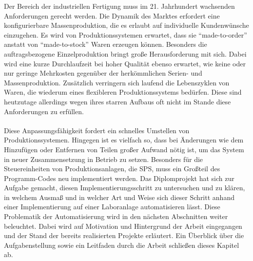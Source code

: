 
Der Bereich der industriellen Fertigung muss im 21. Jahrhundert wachsenden Anforderungen gerecht werden. Die Dynamik des Marktes erfordert eine konfigurierbare Massenproduktion, die es erlaubt auf individuelle Kundenwünsche einzugehen. Es wird von Produktionssystemen erwartet, dass sie "`made-to-order"' anstatt von "`made-to-stock"' Waren erzeugen können. Besonders die auftragsbezogene Einzelproduktion bringt große Herausforderung mit sich. Dabei wird eine kurze Durchlaufzeit bei hoher Qualität ebenso erwartet, wie keine oder nur geringe Mehrkosten gegenüber der herkömmlichen Serien- und Massenproduktion. Zusätzlich verringern sich laufend die Lebenszyklen von Waren, die wiederum eines flexibleren Produktionssystems bedürfen. Diese sind heutzutage allerdings wegen ihres starren Aufbaus oft nicht im Stande diese Anforderungen zu erfüllen. \cite{wlepuschitz_2014} \\\\
Diese Anpassungsfähigkeit fordert ein schnelles Umstellen von Produktionssystemen. Hingegen ist es vielfach so, dass bei Änderungen wie dem Hinzufügen oder Entfernen von Teilen großer Aufwand nötig ist, um das System in neuer Zusammensetzung in Betrieb zu setzen. Besonders für die Steuereinheiten von Produktionsanlagen, die \ac{SPS}, muss ein Großteil des Programm-Codes neu implementiert werden. \cite{Lepuschitz_PhaseAgent}  
Das Diplomprojekt hat sich zur Aufgabe gemacht, diesen Implementierungsschritt zu untersuchen und zu klären, in welchem Ausmaß und in welcher Art und Weise sich dieser Schritt anhand einer Implementierung auf einer Laboranlage automatisieren lässt. 
 Diese Problematik der Automatisierung wird in den nächsten Abschnitten weiter beleuchtet. Dabei wird auf Motivation und Hintergrund der Arbeit eingegangen und der Stand der bereits realisierten Projekte erläutert. Ein Überblick über die Aufgabenstellung sowie ein Leitfaden durch die Arbeit schließen dieses Kapitel ab. 
